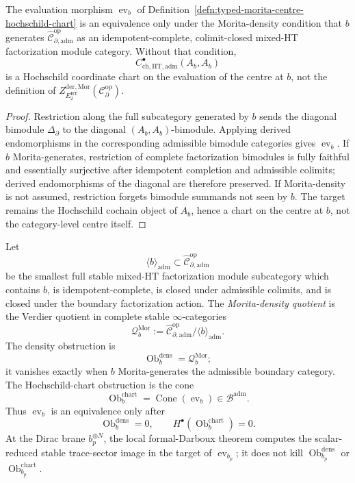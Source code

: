 \begin{prop}
\label{prop:typed-morita-centre-hochschild-chart}
The evaluation morphism
\(\operatorname{ev}_b\) of
Definition~\ref{defn:typed-morita-centre-hochschild-chart} is an
equivalence only under the Morita-density condition that \(b\)
generates
\(\widehat{\mathcal C}^{\mathrm{op}}_{\partial,\mathrm{adm}}\) as an
idempotent-complete, colimit-closed mixed-HT factorization module
category.  Without that condition,
\[
  C^\bullet_{\mathrm{ch},\mathrm{HT},\mathrm{adm}}(A_b,A_b)
\]
is a Hochschild coordinate chart on the evaluation of the centre at
\(b\), not the definition of
\(Z^{\mathrm{der},\mathrm{Mor}}_{E_2^{\mathrm{HT}}}
(\mathcal C^{\mathrm{op}}_\partial)\).
\end{prop}

\begin{proof}
Restriction along the full subcategory generated by \(b\) sends the
diagonal bimodule \(\Delta_\partial\) to the diagonal
\((A_b,A_b)\)-bimodule.  Applying derived endomorphisms in the
corresponding admissible bimodule categories gives
\(\operatorname{ev}_b\).  If \(b\) Morita-generates, restriction of
complete factorization bimodules is fully faithful and essentially
surjective after idempotent completion and admissible colimits; derived
endomorphisms of the diagonal are therefore preserved.  If
Morita-density is not assumed, restriction forgets bimodule summands not
seen by \(b\).  The target remains the Hochschild cochain object of
\(A_b\), hence a chart on the centre at \(b\), not the category-level
centre itself.
\end{proof}

\begin{defn}
\label{defn:morita-density-quotient-chart-cone}
Let
\[
  \langle b\rangle_{\mathrm{adm}}
  \subset
  \widehat{\mathcal C}^{\mathrm{op}}_{\partial,\mathrm{adm}}
\]
be the smallest full stable mixed-HT factorization module subcategory
which contains \(b\), is idempotent-complete, is closed under admissible
colimits, and is closed under the boundary factorization action.  The
\emph{Morita-density quotient} is the Verdier quotient in complete
stable \(\infty\)-categories
\[
  \mathcal Q_b^{\mathrm{Mor}}
  :=
  \widehat{\mathcal C}^{\mathrm{op}}_{\partial,\mathrm{adm}}
  /\langle b\rangle_{\mathrm{adm}} .
\]
The density obstruction is
\[
  \operatorname{Ob}^{\mathrm{dens}}_b
  =
  \mathcal Q_b^{\mathrm{Mor}};
\]
it vanishes exactly when \(b\) Morita-generates the admissible boundary
category.  The Hochschild-chart obstruction is the cone
\[
  \operatorname{Ob}^{\mathrm{chart}}_b
  =
  \operatorname{Cone}(\operatorname{ev}_b)
  \in\mathcal B^{\mathrm{adm}}.
\]
Thus \(\operatorname{ev}_b\) is an equivalence only after
\[
  \operatorname{Ob}^{\mathrm{dens}}_b=0,
  \qquad
  H^\bullet(\operatorname{Ob}^{\mathrm{chart}}_b)=0.
\]
At the Dirac brane \(b_p^{\oplus N}\), the local formal-Darboux theorem
computes the scalar-reduced stable trace-sector image in the target of
\(\operatorname{ev}_{b_p}\); it does not kill
\(\operatorname{Ob}^{\mathrm{dens}}_{b_p}\) or
\(\operatorname{Ob}^{\mathrm{chart}}_{b_p}\).
\end{defn}

